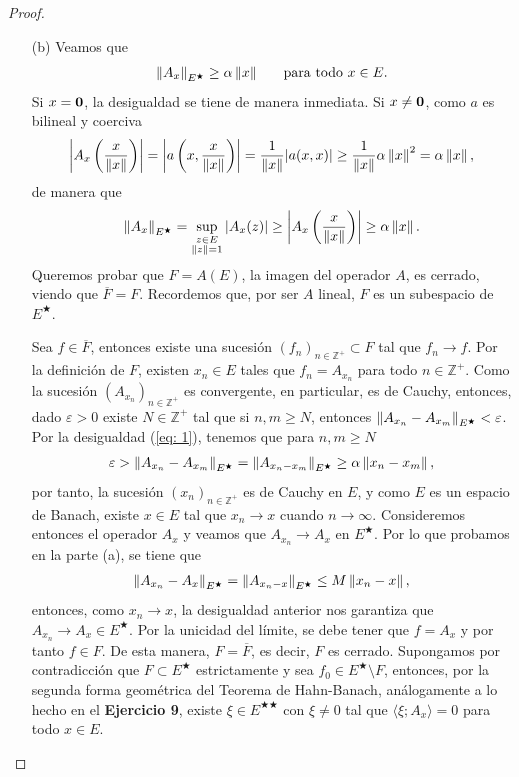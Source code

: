 \begin{proof}
\begin{enumerate}
        \item[(b)] Veamos que
        \begin{align}\label{eq: 1}
            \left\|A_x\right\|_{E^\bigstar}\geq \alpha\left\|x\right\| \hspace{5mm} \text{ para todo } x \in E.
        \end{align}
        Si $x=\mathbf{0}$, la desigualdad se tiene de manera inmediata. Si $x\neq \mathbf{0}$, como $a$ es bilineal y coerciva
        \begin{align*}
            \left|A_x\left(\dfrac{x}{\left\|x\right\|}\right)\right|=\left|a\left(x,\frac{x}{\left\|x\right\|}\right)\right|=\dfrac{1}{\left\|x\right\|}|a(x,x)|\geq \dfrac{1}{\left\|x\right\|}\alpha\left\|x\right\|^2=\alpha\left\|x\right\|,
        \end{align*}
        de manera que
        \begin{align*}
            \left\|A_x\right\|_{E^\bigstar}=\sup_{\substack{z \in E\\ \left\|z\right\|=1}}|A_x(z)|\geq \left|A_x\left(\dfrac{x}{\left\|x\right\|}\right)\right|\geq \alpha\left\|x\right\|.
        \end{align*}
        Queremos probar que $F=A(E)$, la imagen del operador $A$, es cerrado, viendo que $\overline{F}=F$. Recordemos que, por ser $A$ lineal, $F$ es un subespacio de $E^\bigstar$.

        Sea $f \in \overline{F}$, entonces existe una sucesión $(f_n)_{n \in \mathbb{Z}^+}\subset F$ tal que $f_n\to f$. Por la definición de $F$, existen $x_n \in E$ tales que $f_n=A_{x_n}$ para todo $n\in \mathbb{Z}^+$. Como la sucesión $(A_{x_n})_{n \in \mathbb{Z}^+}$ es convergente, en particular, es de Cauchy, entonces, dado $\varepsilon>0$ existe $N\in \mathbb{Z}^+$ tal que si $n,m\geq N$, entonces $\left\|A_{x_n}-A_{x_m}\right\|_{E^\bigstar}<\varepsilon$. Por la desigualdad (\ref{eq: 1}), tenemos que para $n,m\geq N$
        \begin{align*}
            \varepsilon>\left\|A_{x_n}-A_{x_m}\right\|_{E^\bigstar}=\left\|A_{x_n-x_m}\right\|_{E^\bigstar}\geq \alpha\left\|x_n-x_m\right\|,
        \end{align*}
        por tanto, la sucesión $(x_n)_{n \in \mathbb{Z}^+}$ es de Cauchy en $E$, y como $E$ es un espacio de Banach, existe $x \in E$ tal que $x_n\to x$ cuando $n\to \infty$. Consideremos entonces el operador $A_x$ y veamos que $A_{x_n}\to A_x$ en $E^\bigstar$. Por lo que probamos en la parte (a), se tiene que
        \begin{align*}
            \left\|A_{x_n}-A_x\right\|_{E^\bigstar}=\left\|A_{x_n-x}\right\|_{E^\bigstar}\leq M\left\|x_n-x\right\|,
        \end{align*}
        entonces, como $x_n\to x$, la desigualdad anterior nos garantiza que $A_{x_n}\to A_x \in E^{\bigstar}$. Por la unicidad del límite, se debe tener que $f=A_x$ y por tanto $f \in F$. De esta manera, $F=\overline{F}$, es decir, $F$  es cerrado. Supongamos por contradicción que $F\subset E^\bigstar$ estrictamente y sea $f_0 \in E^{\bigstar}\setminus F$, entonces, por la segunda forma geométrica del Teorema de Hahn-Banach, análogamente a lo hecho en el \textbf{Ejercicio 9}, existe $\xi \in E^{\bigstar\bigstar}$ con $\xi \neq 0$ tal que $\langle \xi;A_x\rangle=0$ para todo $x \in E$.
        

\end{enumerate}
\end{proof}
